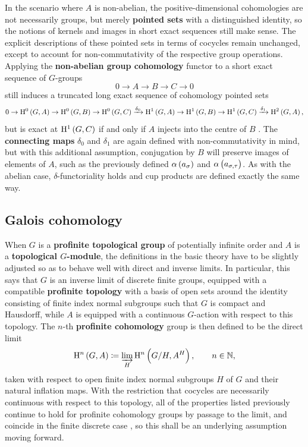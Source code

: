 In the scenario where $ A $ is non-abelian, the positive-dimensional cohomologies are not necessarily groups, but merely \textbf{pointed sets} with a distinguished identity, so the notions of kernels and images in short exact sequences still make sense. The explicit descriptions of these pointed sets in terms of cocycles remain unchanged, except to account for non-commutativity of the respective group operations. Applying the \textbf{non-abelian group cohomology} functor to a short exact sequence of $ G $-groups
$$ 0 \to A \to B \to C \to 0 $$
still induces a truncated long exact sequence of cohomology pointed sets
$$ 0 \to \H^0\br{G, A} \to \H^0\br{G, B} \to \H^0\br{G, C} \xrightarrow{\delta_0} \H^1\br{G, A} \to \H^1\br{G, B} \to \H^1\br{G, C} \xrightarrow{\delta_1} \H^2\br{G, A}, $$
but is exact at $ \H^1\br{G, C} $ if and only if $ A $ injects into the centre of $ B $ \cite[Appendix VII]{Ser80}. The \textbf{connecting maps} $ \delta_0 $ and $ \delta_1 $ are again defined with non-commutativity in mind, but with this additional assumption, conjugation by $ B $ will preserve images of elements of $ A $, such as the previously defined $ \alpha\br{a_\sigma} $ and $ \alpha\br{a_{\sigma, \tau}} $. As with the abelian case, $ \delta $-functoriality holds and cup products are defined exactly the same way.

\subsection{Galois cohomology}

When $ G $ is a \textbf{profinite topological group} of potentially infinite order and $ A $ is a \textbf{topological $ G $-module}, the definitions in the basic theory have to be slightly adjusted so as to behave well with direct and inverse limits. In particular, this says that $ G $ is an inverse limit of discrete finite groups, equipped with a compatible \textbf{profinite topology} with a basis of open sets around the identity consisting of finite index normal subgroups such that $ G $ is compact and Hausdorff, while $ A $ is equipped with a continuous $ G $-action with respect to this topology. The $ n $-th \textbf{profinite cohomology} group is then defined to be the direct limit
$$ \H^n\br{G, A} \coloneqq \varinjlim_H \H^n\br{G / H, A^H}, \qquad n \in \NN, $$
taken with respect to open finite index normal subgroups $ H $ of $ G $ and their natural inflation maps. With the restriction that cocycles are necessarily continuous with respect to this topology, all of the properties listed previously continue to hold for profinite cohomology groups by passage to the limit, and coincide in the finite discrete case \cite[Section X.3]{Ser80}, so this shall be an underlying assumption moving forward.


